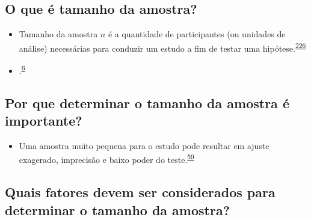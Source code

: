 \documentclass[
  a4paper,
]{book}
\providecommand{\tightlist}{%
  \setlength{\itemsep}{0pt}\setlength{\parskip}{0pt}}
\begin{document}
\hypertarget{o-que-uxe9-tamanho-da-amostra}{%
\subsection{O que é tamanho da amostra?}\label{o-que-uxe9-tamanho-da-amostra}}

\begin{itemize}
\item
  Tamanho da amostra \(n\) é a quantidade de participantes (ou unidades de análise) necessárias para conduzir um estudo a fim de testar uma hipótese.\textsuperscript{\protect\hyperlink{ref-rodruxedguezdeluxe1guila2014}{226}}
\item
  .\textsuperscript{\protect\hyperlink{ref-Banerjee2010}{6}}
\end{itemize}

\hypertarget{por-que-determinar-o-tamanho-da-amostra-uxe9-importante}{%
\subsection{Por que determinar o tamanho da amostra é importante?}\label{por-que-determinar-o-tamanho-da-amostra-uxe9-importante}}

\begin{itemize}
\tightlist
\item
  Uma amostra muito pequena para o estudo pode resultar em ajuste exagerado, imprecisão e baixo poder do teste.\textsuperscript{\protect\hyperlink{ref-van2022a}{59}}
\end{itemize}

\hypertarget{quais-fatores-devem-ser-considerados-para-determinar-o-tamanho-da-amostra}{%
\subsection{Quais fatores devem ser considerados para determinar o tamanho da amostra?}\label{quais-fatores-devem-ser-considerados-para-determinar-o-tamanho-da-amostra}}
\end{document}
